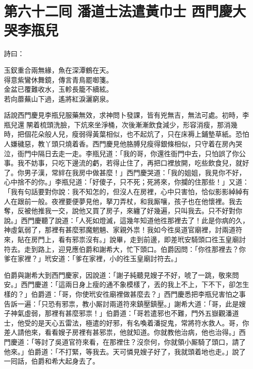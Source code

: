 
\chapter*{第六十二囘 潘道士法遣黃巾士 西門慶大哭李瓶兒}


詩曰：

\begin{myquote}
玉釵重合兩無緣，魚在深潭鶴在天。\\得意紫鸞休舞鏡，傳言青鳥罷啣箋。\\金盆已覆難收水，玉軫長籠不續絃。\\若向蘼蕪山下過，遙將紅淚灑窮泉。
\end{myquote}

話說西門慶見李瓶兒服藥無效，求神問卜發課，皆有兇無吉，無法可處。初時，李瓶兒還𨴃䦛着梳頭洗臉，下炕來坐淨桶，次後漸漸飲食減少，形容消瘦，那消幾時，把個花朵般人兒，瘦弱得黃葉相似，也不起炕了，只在床褥上鋪墊草紙。恐怕人嫌穢惡，教丫頭只燒着香。西門慶見他胳膊兒瘦得銀條相似，只守着在房內哭泣，衙門中隔日去走一走。李瓶兒道：「我的哥，你還徃衙門中去，只怕誤了你公事。我不妨事，只吃下邊流的虧，若得止住了，再把口裡放開，吃些飲食兒，就好了。你男子漢，常絆在我房中做甚麼！」西門慶哭道：「我的姐姐，我見你不好，心中捨不的你。」李瓶兒道：「好傻子，只不死；死將來，你攔的住那些！」又道：「我有句話要對你說：我不知怎的，但沒人在房裡，心中只害怕，恰似影影綽綽有人在跟前一般。夜裡要便夢見他，拏刀弄杖，和我厮嚷，孩子也在他懷裡。我去奪，反被他推我一交，說他又買了房子，來纏了好幾遍，只叫我去。只不好對你說。」西門慶聽了說道：「人死如燈滅，這幾年知道他徃那裡去了！此是你病的久，神虛氣弱了，那裡有甚麼邪魔魍魎、家親外祟！我如今徃吳道官廟裡，討兩道符來，貼在房門上，看有邪祟沒有。」說畢，走到前邊，即差玳安騎頭口徃玉皇廟討符去。走到路上，迎見應伯爵和謝希大，忙下頭口。伯爵因問：「你徃那裡去？你爹在家裡？」玳安道：「爹在家裡，小的徃玉皇廟討符去。」

伯爵與謝希大到西門慶家，因說道：「謝子純聽見嫂子不好，唬了一跳，敬來問安。」西門慶道：「這兩日身上瘦的通不象模樣了，丟的我上不上，下不下，卻怎生樣的？」伯爵道：「哥，你使玳安徃廟裡做甚麼去？」西門慶悉把李瓶兒害怕之事告訴一遍：「只恐有邪祟，教小厮討兩道符來鎮壓鎮壓。」謝希大道：「哥，此是嫂子神氣虛弱，那裡有甚麼邪祟！」伯爵道：「哥若遣邪也不難，門外五嶽觀潘道士，他受的是天心五雷法，極遣的好邪，有名喚着潘捉鬼，常將符水救人。哥，你差人請他來，看看嫂子房裡有甚邪祟，他就知道。你就教他治病，他也治得。」西門慶道：「等討了吳道官符來看，在那裡住？沒奈何，你就領小厮騎了頭口，請了他來。」伯爵道：「不打緊，等我去。天可憐見嫂子好了，我就頭着地也走。」{}說了一囘話，伯爵和希大起身去了。

